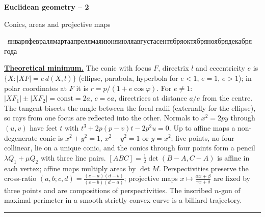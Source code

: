 \documentclass[11pt,a4paper]{article}
\newcommand{\head}[1]{\par\medskip\noindent\textbf{\underline{#1}}\quad}
\newcommand{\sheettitle}[3]{%
  \begin{center}
  {\huge\bfseries #1\par}\vspace{1.2em}
  {\Large #2\par}\vspace{0.8em}
  \if\relax\detokenize{#3}\relax\else{\Large #3\par}\vspace{0.8em}\fi
  {\begin{otherlanguage}{russian}\number\day~\ifcase\month\or января\or февраля\or марта\or апреля\or мая\or июня\or июля\or августа\or сентября\or октября\or ноября\or декабря\fi~\number\year~года\end{otherlanguage}\par}
  \end{center}\vspace{0.5em}}
\begin{document}
\sheettitle{Euclidean geometry -- 2}{Conics, areas and projective maps}{Homework}

\head{Theoretical minimum.} The conic with focus $F$, directrix $l$ and
eccentricity $e$ is $\{X: |XF|=e\,d(X,l)\}$ (ellipse, parabola, hyperbola for
$e<1$, $e=1$, $e>1$); in polar coordinates at $F$ it is
$r=p/(1+e\cos\varphi)$. For $e\ne1$: $|XF_1|\pm|XF_2|=\mathrm{const}=2a$,
$c=ea$, directrices at distance $a/e$ from the centre. The tangent bisects the
angle between the focal radii (externally for the ellipse), so rays from one
focus are reflected into the other. Normals to $x^2=2py$ through $(u,v)$
have feet $t$ with $t^3+2p(p-v)t-2p^2u=0$. Up to affine maps a non-degenerate
conic is $x^2+y^2=1$, $x^2-y^2=1$ or $y=x^2$; five points, no four collinear,
lie on a unique conic, and the conics through four points form a pencil
$\lambda Q_1+\mu Q_2$ with three line pairs. $[ABC]=\frac12\det(B-A,C-A)$ is
affine in each vertex; affine maps multiply areas by $\det M$. Perspectivities
preserve the cross-ratio $(a,b;c,d)=\frac{(c-a)(d-b)}{(c-b)(d-a)}$; projective
maps $x\mapsto\frac{\alpha x+\beta}{\gamma x+\delta}$ are fixed by three
points and are compositions of perspectivities. The inscribed $n$-gon of
maximal perimeter in a smooth strictly convex curve is a billiard trajectory.

\medskip\noindent\rule{\linewidth}{0.4pt}
\end{document}
